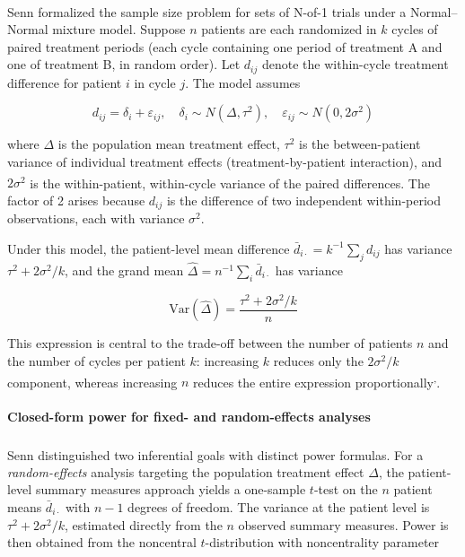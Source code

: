 \documentclass[
  11pt,
]{article}
\begin{document}
Senn\textsuperscript{}
formalized the sample size problem for sets of N-of-1 trials under a
Normal--Normal mixture model. Suppose \(n\) patients are each randomized
in \(k\) cycles of paired treatment periods (each cycle containing one
period of treatment A and one of treatment B, in random order). Let
\(d_{ij}\) denote the within-cycle treatment difference for patient
\(i\) in cycle \(j\). The model assumes

\[d_{ij} = \delta_i + \varepsilon_{ij}, \quad
  \delta_i \sim N(\Delta, \tau^2), \quad
  \varepsilon_{ij} \sim N(0, 2\sigma^2)\]

where \(\Delta\) is the population mean treatment effect, \(\tau^2\) is
the between-patient variance of individual treatment effects
(treatment-by-patient interaction), and \(2\sigma^2\) is the
within-patient, within-cycle variance of the paired
differences\textsuperscript{}.
The factor of 2 arises because \(d_{ij}\) is the difference of two
independent within-period observations, each with variance \(\sigma^2\).

Under this model, the patient-level mean difference
\(\bar{d}_{i\cdot} = k^{-1}\sum_j d_{ij}\) has variance
\(\tau^2 + 2\sigma^2/k\), and the grand mean
\(\hat{\Delta} = n^{-1}\sum_i \bar{d}_{i\cdot}\) has variance

\[\text{Var}(\hat{\Delta}) =
  \frac{\tau^2 + 2\sigma^2/k}{n}\]

This expression is central to the trade-off between the number of
patients \(n\) and the number of cycles per patient \(k\): increasing
\(k\) reduces only the \(2\sigma^2/k\) component, whereas increasing
\(n\) reduces the entire expression
proportionally\textsuperscript{,}.

\paragraph{Closed-form power for fixed- and random-effects
analyses}\label{closed-form-power-for-fixed--and-random-effects-analyses}

Senn\textsuperscript{}
distinguished two inferential goals with distinct power formulas. For a
\emph{random-effects} analysis targeting the population treatment effect
\(\Delta\), the patient-level summary measures approach yields a
one-sample \(t\)-test on the \(n\) patient means \(\bar{d}_{i\cdot}\)
with \(n - 1\) degrees of freedom. The variance at the patient level is
\(\tau^2 + 2\sigma^2/k\), estimated directly from the \(n\) observed
summary measures. Power is then obtained from the noncentral
\(t\)-distribution with noncentrality parameter
\end{document}
